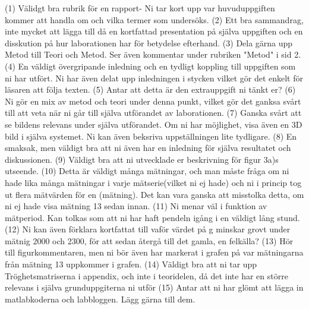 (1) Välidgt bra rubrik för en rapport- Ni tar kort upp var huvuduppgiften kommer att handla om och vilka termer som undersöks.
\newline
(2) Ett bra sammandrag, inte mycket att lägga till då en kortfattad presentation på själva uppgiften och en disskution på hur laborationen har för betydelse  efterhand.
\newline
(3) Dela gärna upp Metod till Teori och Metod. Ser även kommentar under rubriken "Metod" i sid 2.
\newline
(4) En väldigt övergripande inledning och en tydligt koppling till uppgiften som ni har utfört. Ni har även delat upp inledningen i stycken vilket gör det enkelt för läsaren att följa texten.
\newline
(5) Antar att detta är den extrauppgift ni tänkt er?
\newline
(6) Ni gör en mix av metod och teori under denna punkt, vilket gör det ganksa svårt till att veta när ni går till själva utförandet av laborationen. 
\newline
(7) Ganska svårt att se bildens relevans under själva utförandet. Om ni har möjlighet, visa även en 3D bild i själva systemet. Ni kan även beksriva  uppställningen lite tydligare.
\newline
(8) En smaksak, men väldigt bra att ni även har en inledning för själva resultatet och diskussionen.
\newline
(9) Väldigt bra att ni utvecklade er beskrivning för figur 3a)s utseende.
\newline
(10) Detta är väldigt många mätningar, och man måste fråga om ni hade lika många mätningar i varje mätserie(vilket ni ej hade) och ni i princip tog ut flera mätvärden för en (mätning). Det kan vara ganska att misstolka detta, om ni ej hade visa mätning 13 sedan innan.
\newline
(11) Ni menar väl i funktion av mätperiod. Kan tolkas som att ni har haft pendeln igång i en väldigt lång stund.
\newline
(12) Ni kan även förklara kortfattat till vaför värdet på g minskar grovt under mätnig 2000 och 2300, för att sedan återgå till det gamla, en felkälla?
\newline
(13) Hör till figurkommentaren, men ni bör även har markerat i grafen på var mätningarna från mätning 13 uppkommer i grafen.
\newline
(14) Väldigt bra att ni tar upp Tröghetsmatriserna i appendix, och inte i teoridelen, då det inte har en större relevans i själva grunduppgiterna ni utför
\newline
(15) Antar att ni har glömt att lägga in matlabkoderna och labbloggen. Lägg gärna till dem.



